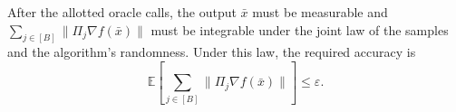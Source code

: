 \documentclass[10pt]{article}
\theoremstyle{definition}
\begin{document}
After the allotted oracle calls, the output $\bar{x}$ must be measurable and $\sum_{j\in[B]}\|\Pi_j\nabla f(\bar{x})\|$ must be integrable under the joint law of the samples and the algorithm's randomness. Under this law, the required accuracy is
\[
\mathbb{E}\left[\sum_{j\in[B]}\|\Pi_j\nabla f(\bar{x})\|\right]\leq\varepsilon.
\]
\end{document}
